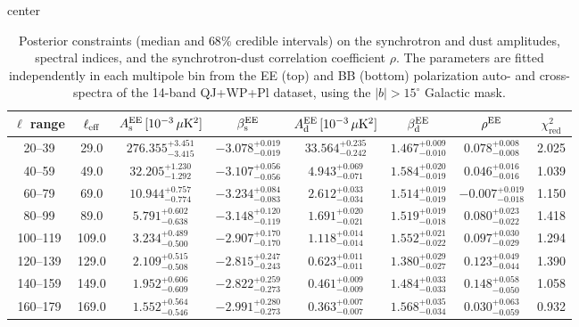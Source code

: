 \begin{table}[h]
\centering
\setlength{\tabcolsep}{4pt}
\caption{Posterior constraints (median and $68\%$ credible intervals) on the synchrotron and dust amplitudes, spectral indices, and the synchrotron-dust correlation coefficient $\rho$. The parameters are fitted independently in each multipole bin from the EE (top) and BB (bottom) polarization auto- and cross-spectra of the 14-band QJ+WP+Pl dataset, using the $|b|>15^\circ$ Galactic mask.}
\label{tab:bin_to_bin_galcut15_all_pairs}
\begin{adjustbox}{center}
\begin{tabular}{cccccccc}
\toprule
$\ell$ range & $\ell_{\rm eff}$ & $A^{\rm EE}_{\rm s}\,[10^{-3}\,\mu\mathrm{K}^2]$ & $\beta^{\rm EE}_{\rm s}$ & $A^{\rm EE}_{\rm d}\,[10^{-3}\,\mu\mathrm{K}^2]$ & $\beta^{\rm EE}_{\rm d}$ & $\rho^{\rm EE}$ & $\chi^2_\mathrm{red}$ \\
\midrule
20--39 & 29.0 & $276.355^{+3.451}_{-3.415}$ & $-3.078^{+0.019}_{-0.019}$ & $33.564^{+0.235}_{-0.242}$ & $1.467^{+0.009}_{-0.010}$ & $0.078^{+0.008}_{-0.008}$ & 2.025 \\
40--59 & 49.0 & $32.205^{+1.230}_{-1.292}$ & $-3.107^{+0.056}_{-0.056}$ & $4.943^{+0.069}_{-0.071}$ & $1.584^{+0.020}_{-0.019}$ & $0.046^{+0.016}_{-0.016}$ & 1.039 \\
60--79 & 69.0 & $10.944^{+0.757}_{-0.774}$ & $-3.234^{+0.084}_{-0.083}$ & $2.612^{+0.033}_{-0.034}$ & $1.514^{+0.019}_{-0.019}$ & $-0.007^{+0.019}_{-0.018}$ & 1.150 \\
80--99 & 89.0 & $5.791^{+0.602}_{-0.638}$ & $-3.148^{+0.120}_{-0.119}$ & $1.691^{+0.020}_{-0.021}$ & $1.519^{+0.019}_{-0.018}$ & $0.080^{+0.023}_{-0.022}$ & 1.418 \\
100--119 & 109.0 & $3.234^{+0.489}_{-0.500}$ & $-2.907^{+0.170}_{-0.170}$ & $1.118^{+0.014}_{-0.014}$ & $1.552^{+0.021}_{-0.022}$ & $0.097^{+0.030}_{-0.029}$ & 1.294 \\
120--139 & 129.0 & $2.109^{+0.515}_{-0.508}$ & $-2.815^{+0.247}_{-0.243}$ & $0.623^{+0.011}_{-0.011}$ & $1.380^{+0.029}_{-0.027}$ & $0.123^{+0.049}_{-0.044}$ & 1.390 \\
140--159 & 149.0 & $1.952^{+0.606}_{-0.609}$ & $-2.822^{+0.259}_{-0.273}$ & $0.461^{+0.009}_{-0.009}$ & $1.484^{+0.033}_{-0.033}$ & $0.148^{+0.058}_{-0.050}$ & 1.058 \\
160--179 & 169.0 & $1.552^{+0.564}_{-0.546}$ & $-2.991^{+0.280}_{-0.273}$ & $0.363^{+0.007}_{-0.007}$ & $1.568^{+0.035}_{-0.034}$ & $0.030^{+0.063}_{-0.059}$ & 0.932 \\

\end{tabular}
\end{adjustbox}
\end{table}
